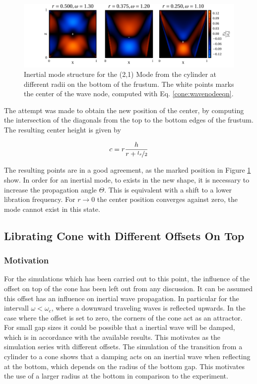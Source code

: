 \clearpage
\begin{figure}[!t]
  \centering
  \includegraphics{gfx/cone/transition/phase.pdf}
  \caption{\label{fig:cone:phase}
    Inertial mode structure for the (2,1) Mode from the cylinder at different radii on the bottom of the frustum.
    The white points marks the center of the wave node, computed with Eq.  \ref{cone:wavenodeeqn}.
  }
\end{figure}

The attempt was made to obtain the new position of the center,
by computing the intersection of the diagonals from the top to the bottom edges of the frustum.
The resulting center height is given by

\begin{align}
\label{cone:wavenodeeqn}
c  = r \frac{h}{r+\nicefrac{l_x}{2}}
\end{align}

The resulting points are in a good agreement, as the marked position in Figure \ref{fig:cone:phase} show.
In order for an inertial mode, to exists in the new shape, it is necessary to increase the propagation angle $\Theta$.
This is equivalent with a shift to a lower libration frequency.
For $r \rightarrow 0$ the center position converges against zero, the mode cannot exist in this state.

\clearpage

\subsection{Librating Cone with Different Offsets On Top}

\subsubsection{Motivation}

For the simulations which has been carried out to this point,
the influence of the offset on top of the cone has been left out from any discussion.
It can be assumed this offset has an influence on inertial wave propagation.
In particular for the intervall $\omega<\omega_c$, where a downward traveling waves is
reflected upwards.
In the case where the offset is set to zero, the corners of the cone act as an attractor.
For small gap sizes it could be possible that a inertial wave will be damped,
which is in accordance with the available results.
This motivates as the simulation series with different offsets.
The simulation of the transition from a cylinder to a cone shows
that a damping acts on an inertial wave when reflecting at the bottom,
which  depends on the radius of the bottom gap.
This motivates the use of a larger radius at the bottom in comparison to the experiment.

